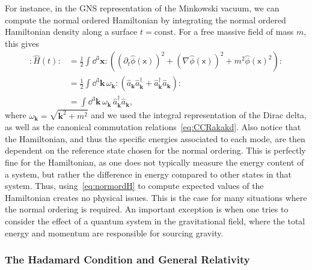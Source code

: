 \documentclass[letterpaper,12pt,titlepage,oneside,final]{book}
\newcommand{\normord}[1]{\vcentcolon\mathrel{#1}\vcentcolon}
\providecommand{\vcentcolon}{\mathrel{\mathop{:}}}
\newcommand{\mf}{\mathsf}%
\begin{document}
For instance, in the GNS representation of the Minkowski vacuum, we can compute the normal ordered Hamiltonian by integrating the normal ordered Hamiltonian density along a surface $t = \text{const}.$ For a free massive field of mass $m$, this gives
\begin{align}
    \normord{\hat{H}(t)} &= \frac{1}{2}\int \dd^3\bm x \normord{\left((\partial_t\hat{\phi}(\mf x))^2 + (\nabla\hat{\phi}(\mf x))^2 + m^2 \hat{\phi}(\mf x)^2\right)}\\
    &= \frac{1}{2}\int\dd^3 \bm k\,\omega_{\bm k} \normord{\left(\hat{a}_{\bm k} \hat{a}_{\bm k}^\dagger + \hat{a}_{\bm k}^\dagger\hat{a}_{\bm k}\right)} \\
    &= \int\dd^3 \bm k\,\omega_{\bm k}\,\hat{a}_{\bm k}^\dagger\hat{a}_{\bm k},\label{eq:normordH}
\end{align}
where $\omega_{\bm k} = \sqrt{\bm k^2 + m^2}$ and we used the integral representation of the Dirac delta, as well as the canonical commutation relations~\eqref{eq:CCRakakd}. Also notice that the Hamiltonian, and thus the specific energies associated to each mode, are then dependent on the reference state chosen for the normal ordering. This is perfectly fine for the Hamiltonian, as one does not typically measure the energy content of a system, but rather the difference in energy compared to other states in that system. Thus, using~\eqref{eq:normordH} to compute expected values of the Hamiltonian creates no physical issues. This is the case for many situations where the normal ordering is required. An important exception is when one tries to consider the effect of a quantum system in the gravitational field, where the total energy and momentum are responsible for sourcing gravity. 


\subsubsection*{The Hadamard Condition and General Relativity}
\end{document}
